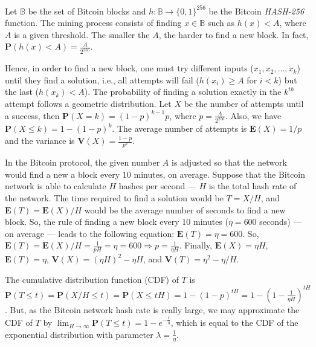 Let $\mathbb{B}$ be the set of Bitcoin blocks and $h: \mathbb{B} \rightarrow \{0, 1\}^{256}$ be the Bitcoin \textit{HASH-256} function. The mining process consists of finding $x \in \mathbb{B}$ such as $h(x) < A$, where $A$ is a given threshold. The smaller the $A$, the harder to find a new block. In fact, $\mathbf{P}(h(x) < A) = \frac{A}{2^{256}}$.

Hence, in order to find a new block, one must try different inputs ($x_1, x_2, \dots, x_k$) until they find a solution, i.e., all attempts will fail ($h(x_i) \geq A$ for $i < k$) but the last ($h(x_k) < A$). The probability of finding a solution exactly in the $k^{th}$ attempt follows a geometric distribution. Let $X$ be the number of attempts until a success, then $\mathbf{P}(X = k) = (1-p)^{k-1} p$, where $p = \frac{A}{2^{256}}$. Also, we have $\mathbf{P}(X \leq k) = 1 - (1-p)^k$. The average number of attempts is $\mathbf{E}(X) = 1/p$ and the variance is $\mathbf{V}(X) = \frac{1-p}{p^2}$.

In the Bitcoin protocol, the given number $A$ is adjusted so that the network would find a new a block every 10 minutes, on average. Suppose that the Bitcoin network is able to calculate $H$ hashes per second --- $H$ is the total hash rate of the network. The time required to find a solution would be $T=X/H$, and $\mathbf{E}(T) = \mathbf{E}(X)/H$ would be the average number of seconds to find a new block. So, the rule of finding a new block every 10 minutes ($\eta = 600$ seconds) --- on average --- leads to the following equation: $\mathbf{E}(T) = \eta = 600$. So, $\mathbf{E}(T) = \mathbf{E}(X)/H = \frac{1}{pH} = \eta = 600 \Rightarrow p = \frac{1}{\eta H}$. Finally, $\mathbf{E}(X) = \eta H$, $\mathbf{E}(T) = \eta$, $\mathbf{V}(X) = (\eta H)^2 - \eta H$, and $\mathbf{V}(T) = \eta^2 - \eta/H$.

The cumulative distribution function (CDF) of $T$ is $\mathbf{P}(T \leq t) = \mathbf{P}(X/H \leq t) = \mathbf{P}(X \leq tH) = 1 - (1-p)^{tH} = 1 - \left( 1-\frac{1}{\eta H} \right)^{tH}$. But, as the Bitcoin network hash rate is really large, we may approximate the CDF of $T$ by $\lim_{H \rightarrow \infty} \mathbf{P}(T \leq t) = 1 - e^{-\frac{t}{\eta}}$, which is equal to the CDF of the exponential distribution with parameter $\lambda = \frac{1}{\eta}$.

